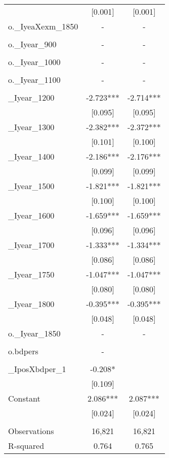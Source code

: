 \documentclass[landscape]{article}
\begin{document}
\begin{tabular}{lcc}
 & [0.001] & [0.001] \\
o.\_IyeaXexm\_1850 & - & - \\
 &  &  \\
o.\_Iyear\_900 & - & - \\
 &  &  \\
o.\_Iyear\_1000 & - & - \\
 &  &  \\
o.\_Iyear\_1100 & - & - \\
 &  &  \\
\_Iyear\_1200 & -2.723*** & -2.714*** \\
 & [0.095] & [0.095] \\
\_Iyear\_1300 & -2.382*** & -2.372*** \\
 & [0.101] & [0.100] \\
\_Iyear\_1400 & -2.186*** & -2.176*** \\
 & [0.099] & [0.099] \\
\_Iyear\_1500 & -1.821*** & -1.821*** \\
 & [0.100] & [0.100] \\
\_Iyear\_1600 & -1.659*** & -1.659*** \\
 & [0.096] & [0.096] \\
\_Iyear\_1700 & -1.333*** & -1.334*** \\
 & [0.086] & [0.086] \\
\_Iyear\_1750 & -1.047*** & -1.047*** \\
 & [0.080] & [0.080] \\
\_Iyear\_1800 & -0.395*** & -0.395*** \\
 & [0.048] & [0.048] \\
o.\_Iyear\_1850 & - & - \\
 &  &  \\
o.bdpers & - &  \\
 &  &  \\
\_IposXbdper\_1 & -0.208* &  \\
 & [0.109] &  \\
Constant & 2.086*** & 2.087*** \\
 & [0.024] & [0.024] \\
 &  &  \\
Observations & 16,821 & 16,821 \\
 R-squared & 0.764 & 0.765 \\ \hline
\end{tabular}
\end{document}
